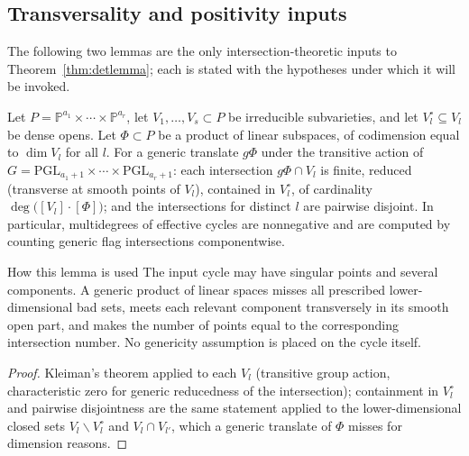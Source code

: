 \documentclass[acmsmall,screen,nonacm]{acmart}
\theoremstyle{definition}
\theoremstyle{remark}
\newcommand{\PP}{\mathbb{P}}
\begin{document}
\subsection{Transversality and positivity inputs}

The following two lemmas are the only intersection-theoretic inputs to
Theorem~\ref{thm:detlemma}; each is stated with the hypotheses under
which it will be invoked.

\begin{lemma}\label{lem:kleiman}
Let $P=\PP^{a_1}\times\cdots\times\PP^{a_r}$, let
$V_1,\dots,V_s\subset P$ be irreducible subvarieties, and let
$V_l^\circ\subseteq V_l$ be dense opens.  Let $\Phi\subset P$ be a
product of linear subspaces, of codimension equal to $\dim V_l$ for
all $l$.  For a generic translate $g\Phi$ under the transitive action
of $G=\mathrm{PGL}_{a_1+1}\times\cdots\times\mathrm{PGL}_{a_r+1}$:
each intersection $g\Phi\cap V_l$ is finite, reduced (transverse at
smooth points of $V_l$), contained in $V_l^\circ$, of cardinality
$\deg\big([V_l]\cdot[\Phi]\big)$; and the intersections for distinct
$l$ are pairwise disjoint.  In particular, multidegrees of effective
cycles are nonnegative and are computed by counting generic flag
intersections componentwise.
\end{lemma}

\begin{detailbox}{How this lemma is used}
The input cycle may have singular points and several components.  A generic
product of linear spaces misses all prescribed lower-dimensional bad sets,
meets each relevant component transversely in its smooth open part, and makes
the number of points equal to the corresponding intersection number.  No
genericity assumption is placed on the cycle itself.
\end{detailbox}

\begin{proof}
Kleiman's theorem \cite{Kleiman74} applied to each $V_l$ (transitive
group action, characteristic zero for generic reducedness of the
intersection); containment in $V_l^\circ$ and pairwise disjointness
are the same statement applied to the lower-dimensional closed sets
$V_l\smallsetminus V_l^\circ$ and $V_l\cap V_{l'}$, which a generic
translate of $\Phi$ misses for dimension reasons.
\end{proof}
\end{document}
